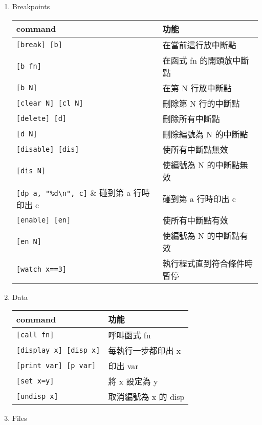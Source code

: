 \begin{enumerate}
    \item Breakpoints \par
    \begin{tabular}{|l|l|}
        \hline
        command                         & 功能 \\
        \hline
        \verb|[break] [b]|              & 在當前這行放中斷點 \\
        \verb|[b fn]|                   & 在函式 fn 的開頭放中斷點 \\
        \verb|[b N]|                    & 在第 N 行放中斷點 \\
        \verb|[clear N] [cl N]|         & 刪除第 N 行的中斷點 \\
        \verb|[delete] [d]|             & 刪除所有中斷點 \\
        \verb|[d N]|                    & 刪除編號為 N 的中斷點 \\
        \verb|[disable] [dis]|          & 使所有中斷點無效 \\
        \verb|[dis N]|                  & 使編號為 N 的中斷點無效 \\
        \verb|[dp a, "%d\n", c]|        & 碰到第 a 行時印出 c \\
        \verb|[enable] [en]|            & 使所有中斷點有效 \\
        \verb|[en N]|                   & 使編號為 N 的中斷點有效 \\
        \verb|[watch x==3]|             & 執行程式直到符合條件時暫停 \\
        \hline
    \end{tabular}
    \item Data \par
    \begin{tabular}{|l|l|}
        \hline
        command                         & 功能 \\
        \hline
        \verb|[call fn]|                & 呼叫函式 fn \\
        \verb|[display x] [disp x]|     & 每執行一步都印出 x \\
        \verb|[print var] [p var]|      & 印出 var \\
        \verb|[set x=y]|                & 將 x 設定為 y \\
        \verb|[undisp x]|               & 取消編號為 x 的 disp \\
        \hline
    \end{tabular}
    \item Files \par

\end{enumerate}
